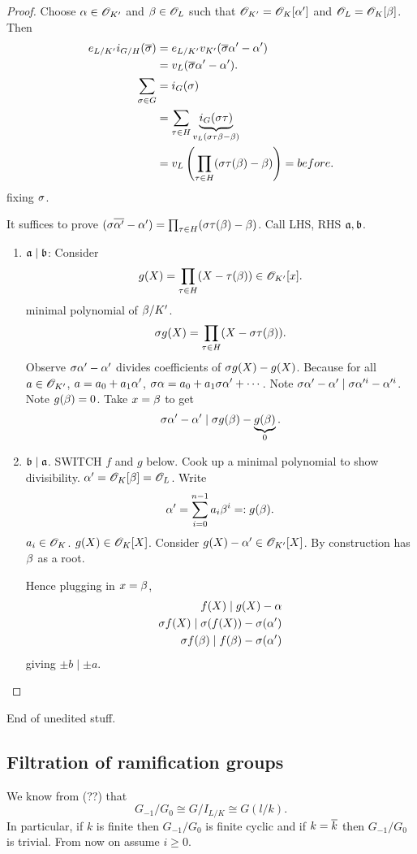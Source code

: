 \begin{proof}
Choose $\alpha\in \mathscr{O}_{K'}$ and $\beta\in \mathscr{O}_L$ such that $\mathscr{O}_{K'}=\mathscr{O}_K[\alpha']$ and $\mathscr{O}_L=\mathscr{O}_K[\beta]$. Then
\begin{align*}
e_{L/K'}i_{G/H}(\overline{\sigma})&=e_{L/K'}v_{K'}(\overline{\sigma}\alpha'-\alpha')\\
&=v_L(\overline{\sigma}\alpha'-\alpha').\\
\sum_{\sigma\in G}&=i_G(\sigma)\\
&=\sum_{\tau\in H} \underbrace{i_G(\sigma\tau)}_{v_L(\sigma\tau\beta-\beta)}\\
&=v_L\left( {\prod_{\tau\in H} (\sigma\tau (\beta)-\beta)} \right)=before.
\end{align*}
fixing $\sigma$.

It suffices to prove $(\sigma\overline{\alpha'}-\alpha')=\prod_{\tau\in H}(\sigma\tau(\beta)-\beta)$.
Call LHS, RHS $\mathfrak{a},\mathfrak{b}$.
\begin{enumerate}
\item
$\mathfrak{a}\mid \mathfrak{b}$: Consider
\[
g(X)=\prod_{\tau\in H}(X-\tau(\beta))\in \mathscr{O}_{K'}[x].
\]
minimal polynomial of $\beta/K'$. 
\[
\sigma g(X)=\prod_{\tau\in H} (X-\sigma\tau(\beta)).
\]
Observe $\sigma\alpha'-\alpha'$ divides coefficients of $\sigma g(X)-g(X)$. Because for all $a\in \mathscr{O}_{K'}$, $a=a_0+a_1\alpha'$, $\sigma\alpha= a_0+a_1\sigma \alpha'+\cdots $. Note $\sigma\alpha'-\alpha'\mid \sigma\alpha'^i-\alpha'^i$. Note $g(\beta)=0$. Take $x=\beta$ to get
\[
\sigma\alpha'-\alpha'\mid \sigma g(\beta)-\underbrace{g(\beta)}_0.
\]
\item %
$\mathfrak{b}\mid \mathfrak{a}$. 
SWITCH $f$ and $g$ below.
Cook up a minimal polynomial to show divisibility. $\alpha'=\mathscr{O}_K[\beta]=\mathscr{O}_L$. Write
\[
\alpha'=\sum_{i=0}^{n-1} a_i\beta^i=:g(\beta).
\]
$a_i\in \mathscr{O}_K$. $g(X)\in \mathscr{O}_K[X]$. Consider $g(X)-\alpha'\in \mathscr{O}_{K'}[X]$. By construction has $\beta$ as a root.

Hence plugging in $x=\beta$,
\begin{align*}
f(X)\mid g(X)-\alpha\\
\sigma f(X)\mid \sigma(f(X))-\sigma(\alpha')\\
\sigma f(\beta)\mid f(\beta)-\sigma(\alpha')
\end{align*}
giving $\pm b\mid \pm a$.
\end{enumerate}
\end{proof}
{\color{red} End of unedited stuff.}
\subsection{Filtration of ramification groups}
We know from (??) that
\[
G_{-1}/G_0\cong G/I_{L/K}\cong G(l/k).
\]
In particular, if $k$ is finite then $G_{-1}/G_0$ is finite cyclic and if $k=\overline{k}$ then $G_{-1}/G_0$ is trivial. 
From now on assume $i\ge 0$.


